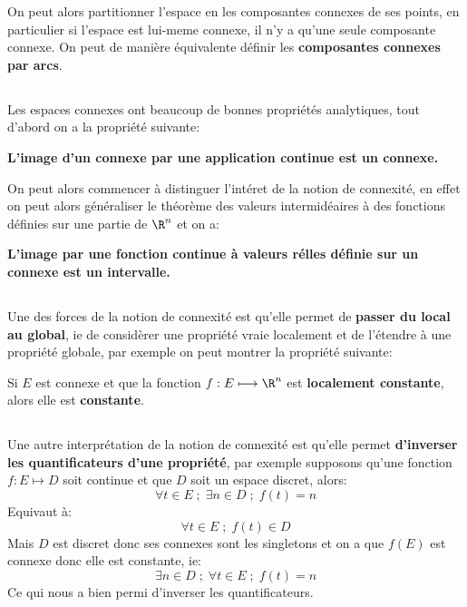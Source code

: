 On peut alors partitionner l'espace en les composantes connexes de ses points, en particulier si l'espace est lui-meme connexe, il n'y a qu'une seule composante connexe. On peut de manière équivalente définir les \textbf{composantes connexes par arcs}.

\subsection*{}
Les espaces connexes ont beaucoup de bonnes propriétés analytiques, tout d'abord on a la propriété suivante:
\begin{center}
   \textbf{L'image d'un connexe par une application continue est un connexe.}
\end{center}
On peut alors commencer à distinguer l'intéret de la notion de connexité, en effet on peut alors généraliser le théorème des valeurs intermidéaires à des fonctions définies sur une partie de \(\R^n\) et on a:
\begin{center}
   \textbf{L'image par une fonction continue à valeurs rélles définie sur un connexe est un intervalle.}
\end{center}

\subsection*{}
Une des forces de la notion de connexité est qu'elle permet de \textbf{passer du local au global}, ie de considèrer une propriété vraie localement et de l'étendre à une propriété globale, par exemple on peut montrer la propriété suivante:
\begin{center}
   Si \( E \) est connexe et que la fonction \( f : E \longmapsto \R^n \) est \textbf{localement constante}, alors elle est \textbf{constante}.
\end{center}
\subsection*{}
Une autre interprétation de la notion de connexité est qu'elle permet \textbf{d'inverser les quantificateurs d'une propriété}, par exemple supposons qu'une fonction \( f : E \longmapsto D \) soit continue et que \( D \) soit un espace discret, alors:
\[ 
   \forall t \in E \; ; \; \exists n \in D \; ; \; f(t) = n 
\]
Equivaut à:
\[ 
   \forall t \in E \; ; \; f(t) \in D
\]
Mais \( D \) est discret donc ses connexes sont les singletons et on a que \( f(E) \) est connexe donc elle est constante, ie:
\[ 
   \exists n \in D \; ; \; \forall t \in E \; ; \; f(t) = n
\]
Ce qui nous a bien permi d'inverser les quantificateurs.

